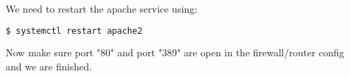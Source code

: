 \vspace{.5em}

\noindent We need to restart the apache service using:
\begin{lstlisting}[language=bash]
  $ systemctl restart apache2
\end{lstlisting}

\vspace{.5em}

\noindent Now make sure port "80" and port "389" are open in the 
firewall/router config and we are finished.

